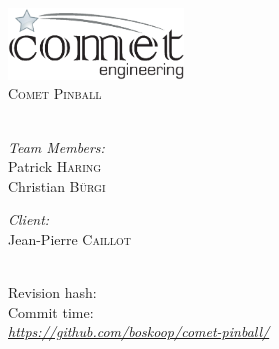 \begin{titlepage}

\begin{center}

\includegraphics[width=0.35\textwidth]{./comet-logo}\\[2.5cm]    

\textsc{\Large Comet Pinball}\\[2cm]

{ \huge \bfseries \doctitle{}}\\[3cm]

\begin{minipage}{0.45\textwidth}
\begin{flushleft} \large
\emph{Team Members:}\\
Patrick \textsc{Haring}\\
Christian \textsc{Bürgi}
\end{flushleft}
\end{minipage}
\begin{minipage}{0.45\textwidth}
\begin{flushright} \large
\emph{Client:} \\
Jean-Pierre \textsc{Caillot}\\
~
\end{flushright}
\end{minipage}

\vfill

{\large 
Revision hash: \gitAbbrevHash \\[0.2cm]
Commit time: \gitCommitterIsoDate \\[0.2cm]
{\footnotesize \itshape \url{https://github.com/boskoop/comet-pinball/}}}

\end{center}

\end{titlepage}
